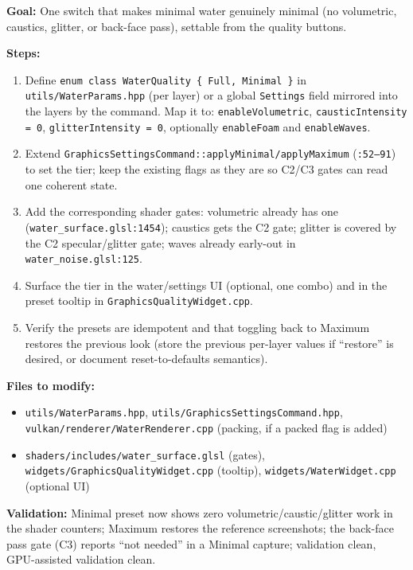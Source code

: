 \documentclass[11pt,a4paper]{article}
\begin{document}
\begin{tcolorbox}[promptbox={Prompt: Add a Water Quality Tier and Wire It into the Quality Presets}]
\textbf{Goal:} One switch that makes minimal water genuinely minimal (no volumetric, caustics, glitter, or back-face pass), settable from the quality buttons.

\textbf{Steps:}
\begin{enumerate}
    \item Define \texttt{enum class WaterQuality \{ Full, Minimal \}} in \texttt{utils/WaterParams.hpp} (per layer) or a global \texttt{Settings} field mirrored into the layers by
    the command. Map it to: \texttt{enableVolumetric}, \texttt{causticIntensity = 0}, \texttt{glitterIntensity = 0}, optionally \texttt{enableFoam} and \texttt{enableWaves}.
    \item Extend \texttt{GraphicsSettingsCommand::applyMinimal/applyMaximum} (\texttt{:52--91}) to set the tier; keep the existing flags as they are so C2/C3 gates can read one
    coherent state.
    \item Add the corresponding shader gates: volumetric already has one (\texttt{water\_surface.glsl:1454}); caustics gets the C2 gate; glitter is covered by the C2
    specular/glitter gate; waves already early-out in \texttt{water\_noise.glsl:125}.
    \item Surface the tier in the water/settings UI (optional, one combo) and in the preset tooltip in \texttt{GraphicsQualityWidget.cpp}.
    \item Verify the presets are idempotent and that toggling back to Maximum restores the previous look (store the previous per-layer values if ``restore'' is desired, or
    document reset-to-defaults semantics).
\end{enumerate}

\textbf{Files to modify:}
\begin{itemize}
    \item \texttt{utils/WaterParams.hpp}, \texttt{utils/GraphicsSettingsCommand.hpp}, \texttt{vulkan/renderer/WaterRenderer.cpp} (packing, if a packed flag is added)
    \item \texttt{shaders/includes/water\_surface.glsl} (gates), \texttt{widgets/GraphicsQualityWidget.cpp} (tooltip), \texttt{widgets/WaterWidget.cpp} (optional UI)
\end{itemize}

\textbf{Validation:} Minimal preset now shows zero volumetric/caustic/glitter work in the shader counters; Maximum restores the reference screenshots; the back-face pass gate
(C3) reports ``not needed'' in a Minimal capture; validation clean, GPU-assisted validation clean.
\end{tcolorbox}
\end{document}
